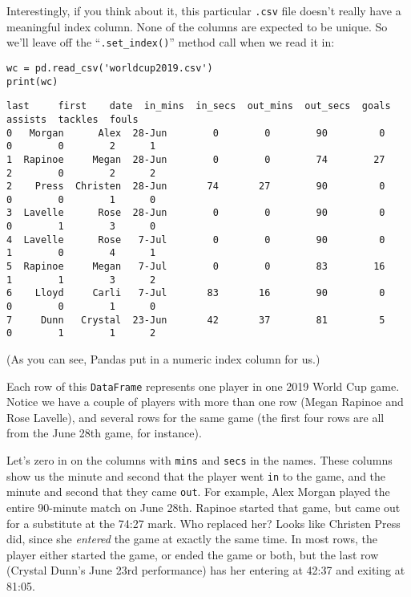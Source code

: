 Interestingly, if you think about it, this particular \texttt{.csv} file
doesn't really have a meaningful index column. None of the columns are expected
to be unique. So we'll leave off the ``\texttt{.set\_index()}'' method call
when we read it in:

\begin{samepage}
\begin{Verbatim}[fontsize=\scriptsize,samepage=true,frame=single,framesep=3mm]
wc = pd.read_csv('worldcup2019.csv')
print(wc)
\end{Verbatim}
\vspace{-.2in}

\begin{Verbatim}[fontsize=\scriptsize,samepage=true,frame=leftline,framesep=5mm,framerule=1mm]
      last     first    date  in_mins  in_secs  out_mins  out_secs  goals  assists  tackles  fouls
0   Morgan      Alex  28-Jun        0        0        90         0      0        0        2      1
1  Rapinoe     Megan  28-Jun        0        0        74        27      2        0        2      2
2    Press  Christen  28-Jun       74       27        90         0      0        0        1      0
3  Lavelle      Rose  28-Jun        0        0        90         0      0        1        3      0
4  Lavelle      Rose   7-Jul        0        0        90         0      1        0        4      1
5  Rapinoe     Megan   7-Jul        0        0        83        16      1        1        3      2
6    Lloyd     Carli   7-Jul       83       16        90         0      0        0        1      0
7     Dunn   Crystal  23-Jun       42       37        81         5      0        1        1      2
\end{Verbatim}
\end{samepage}

(As you can see, Pandas put in a numeric index column for us.)

Each row of this \texttt{DataFrame} represents one player in one 2019 World Cup
game. Notice we have a couple of players with more than one row (Megan Rapinoe
and Rose Lavelle), and several rows for the same game (the first four rows are
all from the June 28th game, for instance).

Let's zero in on the columns with \texttt{mins} and \texttt{secs} in the names.
These columns show us the minute and second that the player went \texttt{in} to
the game, and the minute and second that they came \texttt{out}. For example,
Alex Morgan played the entire 90-minute match on June 28th. Rapinoe started
that game, but came out for a substitute at the 74:27 mark. Who replaced her?
Looks like Christen Press did, since she \textit{entered} the game at exactly
the same time. In most rows, the player either started the game, or ended the
game or both, but the last row (Crystal Dunn's June 23rd performance) has her
entering at 42:37 and exiting at 81:05.


